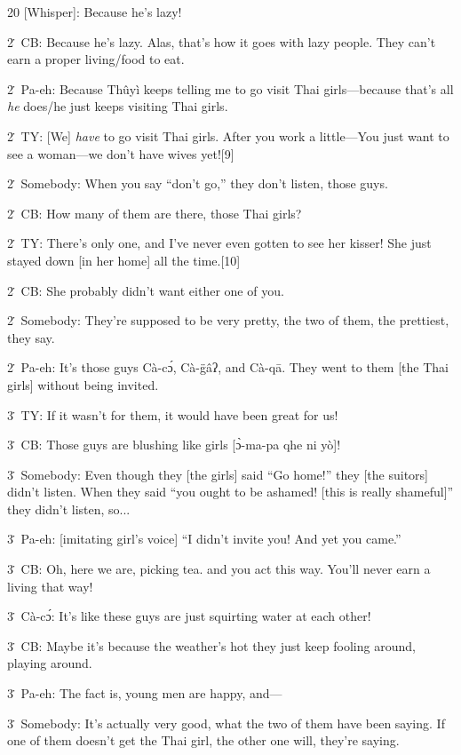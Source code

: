 20 [Whisper]: Because he's lazy!

2\. CB: Because he's lazy.  Alas, that's how it goes with lazy people.  They can't
earn a proper living/food to eat.

2\. Pa-eh: Because Thûyì keeps telling me to go visit Thai girls---because that's
all \textit{he} does/he just keeps visiting Thai girls.

2\. TY: [We] \textit{have} to go visit Thai girls.  After you work a little---You
just want to see a woman---we don't have wives yet![9]

2\. Somebody: When you say ``don't go,'' they don't listen, those guys.

2\. CB: How many of them are there, those Thai girls?

2\. TY: There's only one, and I've never even gotten to see her kisser! She just
stayed down [in her home] all the time.[10]

2\. CB: She probably didn't want either one of you.

2\. Somebody: They're supposed to be very pretty, the two of them, the prettiest,
they say.

2\. Pa-eh: It's those guys Cà-cɔ́, Cà-g̈âʔ, and Cà-qā.  They went to
them [the Thai girls] without being invited.

3\. TY: If it wasn't for them, it would have been great for us!

3\. CB: Those guys are blushing like girls [ɔ̀-ma-pa qhe ni yò]!

3\. Somebody: Even though they [the girls] said ``Go home!'' they [the suitors]
didn't listen.  When they said ``you ought to be ashamed! [this is really shameful]''
they didn't listen, so...

3\. Pa-eh: [imitating girl's voice] ``I didn't invite you!  And yet you came.''

3\. CB: Oh, here we are, picking tea. and you act this way.  You'll never earn
a living that way!

3\. Cà-cɔ́: It's like these guys are just squirting water at each other!

3\. CB: Maybe it's because the weather's hot they just keep fooling around, playing
around.

3\. Pa-eh: The fact is, young men are happy, and---

3\. Somebody: It's actually very good, what the two of them have been saying.
If one of them doesn't get the Thai girl, the other one will, they're saying.

